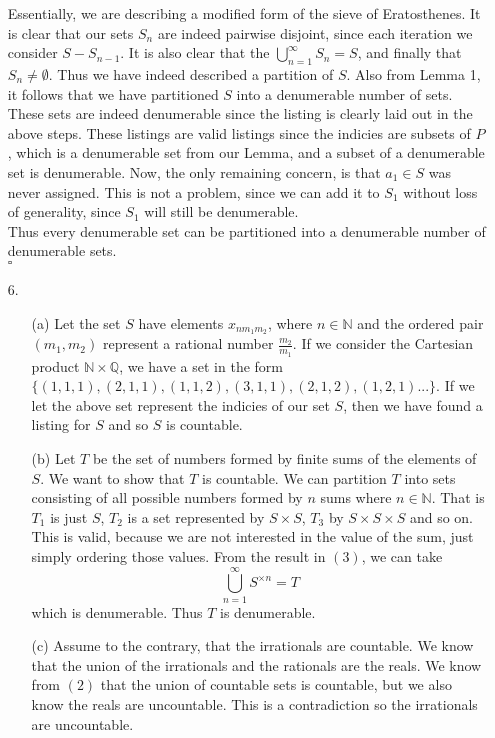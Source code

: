 \documentclass[12pt]{article}
\newcommand{\N}{\mathbb{N}}
\newcommand{\Q}{\mathbb{Q}}
\begin{document}
\begin{enumerate}
    Essentially, we are describing a modified form of the sieve of Eratosthenes. It is clear that our sets $S_n$ are indeed pairwise disjoint, since each iteration we consider $S-S_{n-1}$. It is also clear that the $\displaystyle \bigcup_{n=1}^{\infty} S_n= S$, and finally that $S_n\neq \emptyset$. Thus we have indeed described a partition of $S$. Also from Lemma 1, it follows that we have partitioned $S$ into a denumerable number of sets. These sets are indeed denumerable since the listing is clearly laid out in the above steps. These listings are valid listings since the indicies are subsets of $P$, which is a denumerable set from our Lemma, and a subset of a denumerable set is denumerable. Now, the only remaining concern, is that $a_1\in S$ was never assigned. This is not a problem, since we can add it to $S_1$ without loss of generality, since $S_1$ will still be denumerable.\\
    Thus every denumerable set can be partitioned into a denumerable number of denumerable sets.
    \\ $\square$
    
    \item[6. ]
    \begin{enumerate}
        \item[(a)]Let the set $S$ have elements $x_{nm_1m_2}$, where $n\in\N$ and the ordered pair $(m_1,m_2)$ represent a rational number $\frac{m_2}{m_1}$. If we consider the Cartesian product $\N\times\Q$, we have a set in the form $\{(1,1,1),(2,1,1),(1,1,2),(3,1,1),(2,1,2),(1,2,1)...\}$. If we let the above set represent the indicies of our set $S$, then we have found a listing for $S$ and so $S$ is countable.
        
        \item[(b)]Let $T$ be the set of numbers formed by finite sums of the elements of $S$. We want to show that $T$ is countable. We can partition $T$ into sets consisting of all possible numbers formed by $n$ sums where $n\in\N$. That is $T_1$ is just $S$, $T_2$ is a set represented by $S\times S$, $T_3$ by $S\times S\times S$ and so on. This is valid, because we are not interested in the value of the sum, just simply ordering those values. From the result in $(3)$, we can take $$ \displaystyle \bigcup_{n=1}^{\infty}S^{\times n} =T$$
        which is denumerable. Thus $T$ is denumerable.
        
        \item[(c)]Assume to the contrary, that the irrationals are countable. We know that the union of the irrationals and the rationals are the reals. We know from $(2)$ that the union of countable sets is countable, but we also know the reals are uncountable. This is a contradiction so the irrationals are uncountable. 
    \end{enumerate}
    

\end{enumerate}
\end{document}
